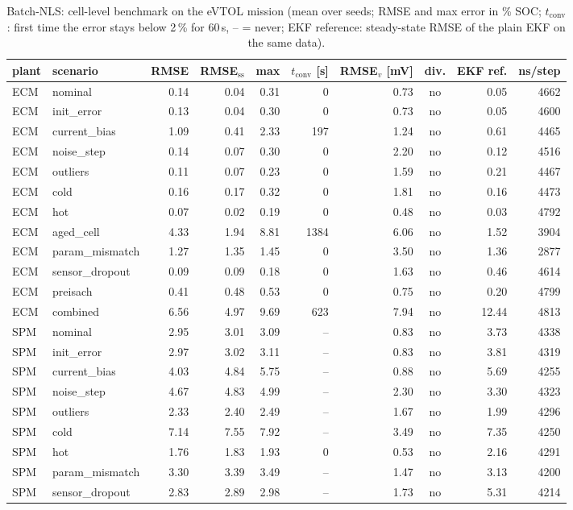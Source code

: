 \begin{table}[H]\centering\footnotesize\setlength{\tabcolsep}{4pt}
\caption{Batch-NLS: cell-level benchmark on the eVTOL mission (mean over seeds; RMSE and max error in \% SOC; $t_\mathrm{conv}$: first time the error stays below 2\,\% for 60\,s, -- = never; EKF reference: steady-state RMSE of the plain EKF on the same data).}\label{tab:cell_BatchNLS}
\begin{tabular}{llrrrrrcrr}\toprule
plant & scenario & RMSE & RMSE$_\mathrm{ss}$ & max & $t_\mathrm{conv}$ [s] & RMSE$_v$ [mV] & div. & EKF ref. & ns/step \\ \midrule
ECM & nominal & 0.14 & 0.04 & 0.31 & 0 & 0.73 & no & 0.05 & 4662 \\
ECM & init\_error & 0.13 & 0.04 & 0.30 & 0 & 0.73 & no & 0.05 & 4600 \\
ECM & current\_bias & 1.09 & 0.41 & 2.33 & 197 & 1.24 & no & 0.61 & 4465 \\
ECM & noise\_step & 0.14 & 0.07 & 0.30 & 0 & 2.20 & no & 0.12 & 4516 \\
ECM & outliers & 0.11 & 0.07 & 0.23 & 0 & 1.59 & no & 0.21 & 4467 \\
ECM & cold & 0.16 & 0.17 & 0.32 & 0 & 1.81 & no & 0.16 & 4473 \\
ECM & hot & 0.07 & 0.02 & 0.19 & 0 & 0.48 & no & 0.03 & 4792 \\
ECM & aged\_cell & 4.33 & 1.94 & 8.81 & 1384 & 6.06 & no & 1.52 & 3904 \\
ECM & param\_mismatch & 1.27 & 1.35 & 1.45 & 0 & 3.50 & no & 1.36 & 2877 \\
ECM & sensor\_dropout & 0.09 & 0.09 & 0.18 & 0 & 1.63 & no & 0.46 & 4614 \\
ECM & preisach & 0.41 & 0.48 & 0.53 & 0 & 0.75 & no & 0.20 & 4799 \\
ECM & combined & 6.56 & 4.97 & 9.69 & 623 & 7.94 & no & 12.44 & 4813 \\
\midrule
SPM & nominal & 2.95 & 3.01 & 3.09 & -- & 0.83 & no & 3.73 & 4338 \\
SPM & init\_error & 2.97 & 3.02 & 3.11 & -- & 0.83 & no & 3.81 & 4319 \\
SPM & current\_bias & 4.03 & 4.84 & 5.75 & -- & 0.88 & no & 5.69 & 4255 \\
SPM & noise\_step & 4.67 & 4.83 & 4.99 & -- & 2.30 & no & 3.30 & 4323 \\
SPM & outliers & 2.33 & 2.40 & 2.49 & -- & 1.67 & no & 1.99 & 4296 \\
SPM & cold & 7.14 & 7.55 & 7.92 & -- & 3.49 & no & 7.35 & 4250 \\
SPM & hot & 1.76 & 1.83 & 1.93 & 0 & 0.53 & no & 2.16 & 4291 \\
SPM & param\_mismatch & 3.30 & 3.39 & 3.49 & -- & 1.47 & no & 3.13 & 4200 \\
SPM & sensor\_dropout & 2.83 & 2.89 & 2.98 & -- & 1.73 & no & 5.31 & 4214 \\
\bottomrule\end{tabular}\end{table}
